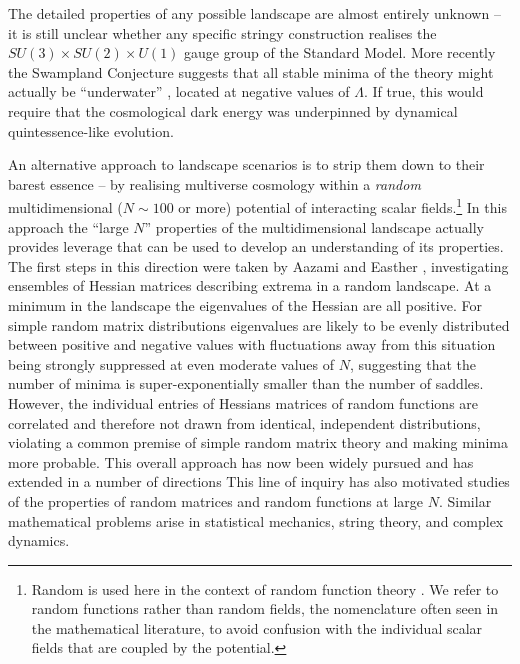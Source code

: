 \documentclass[12pt]{article}
\begin{document}
The detailed properties of any possible landscape are almost entirely unknown -- it is still unclear whether any specific stringy construction  realises  the $SU(3) \times SU(2) \times U(1)$ gauge group of the Standard Model.  More recently the Swampland Conjecture suggests that all stable minima of the theory might actually be ``underwater'' \cite{Agrawal2018},  located at negative values of $\Lambda$. If true, this would require that the cosmological dark energy was underpinned by dynamical quintessence-like evolution.  

An alternative approach to   landscape scenarios is to strip them down to their barest essence -- by realising multiverse cosmology within a {\em random\/} multidimensional ($N\sim100$ or more) potential of interacting scalar fields.\footnote{Random is used here in the  context of random function theory \cite{GRF1, GRF2, GRF3}.  We refer to random functions rather than random fields, the nomenclature often seen in the mathematical literature, to avoid confusion with the individual scalar fields that are coupled by the potential.}  In this approach the ``large $N$'' properties of the multidimensional landscape actually provides leverage that can be used to develop an understanding of its properties. The first steps in this direction were taken by Aazami and Easther \cite{Aazami2006}, investigating ensembles of Hessian matrices describing extrema in a random landscape. At  a minimum in the landscape the eigenvalues of the Hessian are all positive. For simple random matrix distributions eigenvalues are likely to be evenly distributed between positive and negative values with fluctuations away from this situation being strongly suppressed at even moderate values of $N$, suggesting that the number of minima is super-exponentially smaller than the number of saddles. However, the individual entries of Hessians matrices of random functions are correlated and therefore not drawn from identical, independent distributions,\cite{Battefeld2012,Easther2016} violating a common premise of simple random matrix theory and making minima more probable. This overall approach has now been widely pursued and has extended in a number of directions \cite{Easther2006, Frazer2011, Henry2009, Marsh2013, Agarwal2011,Yang2012,Masoumi2016,Yamada2018} This line of inquiry has also motivated studies of the properties of random matrices and random functions at large $N$.\cite{Bray2007,Dean2008,Majumdar2009,Bachlechner2014,Battefeld2012,Fyodorov2013,Masoumi2017} Similar mathematical problems arise in statistical mechanics, string theory, and complex dynamics.\cite{Fyodorov2004,Douglas2004,Douglas2006,Fyodorov2007,Fyodorov2012,Fyodorov2018,Ros2019}
\end{document}
